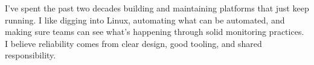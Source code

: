 \par{
I’ve spent the past two decades building and maintaining platforms that just keep running.
I like digging into Linux, automating what can be automated, and making sure teams can see what’s happening through solid monitoring practices.
I believe reliability comes from clear design, good tooling, and shared responsibility.
}